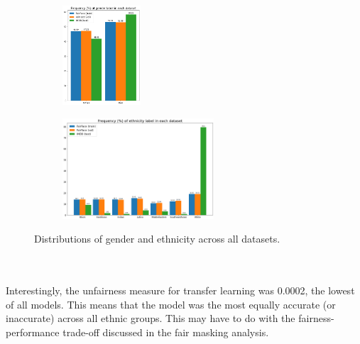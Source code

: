 \begin{figure}[H]
	\centering
	\begin{subfigure}
		\centering
		\includegraphics[width=0.32\textwidth]{figure/gender_hist.png}
	\end{subfigure}
	\quad
	\begin{subfigure}
		\centering
		\includegraphics[width=0.62\textwidth]{figure/eth_hist.png}
	\end{subfigure}
	\caption{Distributions of gender and ethnicity across all datasets.}
	\label{fig: tran_learn}
\end{figure}
\\
\\
Interestingly, the unfairness measure for transfer learning was 0.0002, the lowest of all models. This means that the model was the most equally accurate (or inaccurate) across all ethnic groups. This may have to do with the fairness-performance trade-off discussed in the fair masking analysis.